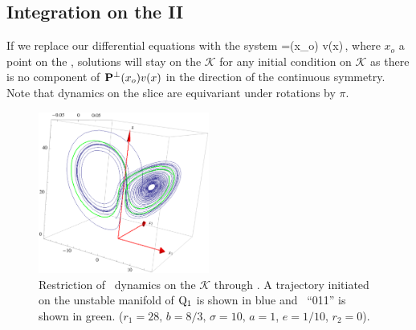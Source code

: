 {\subsection{Integration on the {\slice} II}

If we replace our differential equations  with the system
\beq
	=\PperpOp(x_o) v(x)\,,
	\label{eq:difeqTransvII}
\eeq
where $x_o$ a point on the {\slice},
solutions will stay on the {\slice} $\mathcal{K}$ for any initial condition on $\mathcal{K}$
as there is no component of $\mathbf{P}^{\perp}(x_o) v(x)$ in the direction of the continuous symmetry.
Note that dynamics on the slice are equivariant under rotations by $\pi$.


\begin{figure}[ht]
\begin{center}
\includegraphics[width=0.5\textwidth, clip=true]{../figs/CLEtransvRPO}
\end{center}
\caption[\CLe\ desymmetrization with transverse integration II]{
Restriction of \CLe\ dynamics on the {\slice} $\mathcal{K}$ through
. A trajectory initiated on the unstable
manifold of $\mathrm{Q}_{1}$ is shown in blue and \rpo\ ``011'' is shown
in green.
($r_1=28,\, b=8/3,\, \sigma=10,\, a=1$, $e=1/10$, $r_2=0$).
    }
\label{fig:CLEtransvII}
\end{figure}

}%
